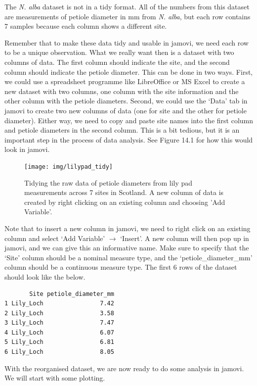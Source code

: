 \documentclass[
  openany]{krantz}
\begin{document}
The \emph{N. alba} dataset is not in a tidy format.
All of the numbers from this dataset are measurements of petiole diameter in mm from \emph{N. alba}, but each row contains 7 samples because each column shows a different site.

Remember that to make these data tidy and usable in jamovi, we need each row to be a unique observation.
What we really want then is a dataset with two columns of data.
The first column should indicate the site, and the second column should indicate the petiole diameter.
This can be done in two ways.
First, we could use a spreadsheet programme like LibreOffice or MS Excel to create a new dataset with two columns, one column with the site information and the other column with the petiole diameters.
Second, we could use the `Data' tab in jamovi to create two new columns of data (one for site and the other for petiole diameter).
Either way, we need to copy and paste site names into the first column and petiole diameters in the second column.
This is a bit tedious, but it is an important step in the process of data analysis.
See Figure 14.1 for how this would look in jamovi.

\begin{figure}
\texttt{[image: img/lilypad\_tidy]} \caption{Tidying the raw data of petiole diameters from lily pad measurements across 7 sites in Scotland. A new column of data is created by right clicking on an existing column and choosing 'Add Variable'.}\label{fig:unnamed-chunk-45}
\end{figure}

Note that to insert a new column in jamovi, we need to right click on an existing column and select `Add Variable' \(\to\) `Insert'.
A new column will then pop up in jamovi, and we can give this an informative name.
Make sure to specify that the `Site' column should be a nominal measure type, and the `petiole\_diameter\_mm' column should be a continuous measure type.
The first 6 rows of the dataset should look like the below.

\begin{verbatim}
       Site petiole_diameter_mm
1 Lily_Loch                7.42
2 Lily_Loch                3.58
3 Lily_Loch                7.47
4 Lily_Loch                6.07
5 Lily_Loch                6.81
6 Lily_Loch                8.05
\end{verbatim}

With the reorganised dataset, we are now ready to do some analysis in jamovi.
We will start with some plotting.
\end{document}
